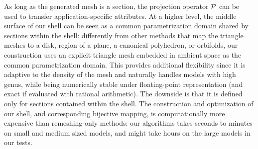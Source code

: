As long as the generated mesh is a section, the projection operator $\P$ can be used to transfer application-specific attributes. At a higher level, the middle surface of our shell can be seen as a common parametrization domain shared by sections within the shell: differently from other methods that map the triangle meshes to a disk, region of a plane, a canonical polyhedron, or orbifolds, our construction uses an explicit triangle mesh embedded in ambient space as the common parametrization domain.
This provides additional flexibility since it is adaptive to the density of the mesh and naturally handles models with high genus, while being numerically stable under floating-point representation (and exact if evaluated with rational arithmetic). The downside is that it is defined only for sections contained within the shell. {
    The construction and optimization of our shell, and corresponding bijective mapping, is computationally more expensive than remeshing-only methods: our algorithms takes seconds to minutes on small and medium sized models, and might take hours on the large models in our tests.}

